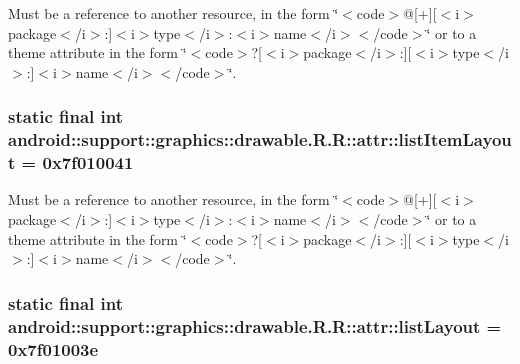 Must be a reference to another resource, in the form \char`\"{}$<$code$>$@\mbox{[}+\mbox{]}\mbox{[}$<$i$>$package$<$/i$>$:\mbox{]}$<$i$>$type$<$/i$>$:$<$i$>$name$<$/i$>$$<$/code$>$\char`\"{} or to a theme attribute in the form \char`\"{}$<$code$>$?\mbox{[}$<$i$>$package$<$/i$>$:\mbox{]}\mbox{[}$<$i$>$type$<$/i$>$:\mbox{]}$<$i$>$name$<$/i$>$$<$/code$>$\char`\"{}. \hypertarget{classandroid_1_1support_1_1graphics_1_1drawable_1_1_r_1_1attr_351fa26f9f498f2c645ec7794e1f63a6}{
\subsubsection[{listItemLayout}]{\setlength{\rightskip}{0pt plus 5cm}static final int android::support::graphics::drawable.R.R::attr::listItemLayout = 0x7f010041}}
\label{classandroid_1_1support_1_1graphics_1_1drawable_1_1_r_1_1attr_351fa26f9f498f2c645ec7794e1f63a6}


Must be a reference to another resource, in the form \char`\"{}$<$code$>$@\mbox{[}+\mbox{]}\mbox{[}$<$i$>$package$<$/i$>$:\mbox{]}$<$i$>$type$<$/i$>$:$<$i$>$name$<$/i$>$$<$/code$>$\char`\"{} or to a theme attribute in the form \char`\"{}$<$code$>$?\mbox{[}$<$i$>$package$<$/i$>$:\mbox{]}\mbox{[}$<$i$>$type$<$/i$>$:\mbox{]}$<$i$>$name$<$/i$>$$<$/code$>$\char`\"{}. \hypertarget{classandroid_1_1support_1_1graphics_1_1drawable_1_1_r_1_1attr_748eaba4836f9fd07dccf78906f08c5b}{
\subsubsection[{listLayout}]{\setlength{\rightskip}{0pt plus 5cm}static final int android::support::graphics::drawable.R.R::attr::listLayout = 0x7f01003e}}
\label{classandroid_1_1support_1_1graphics_1_1drawable_1_1_r_1_1attr_748eaba4836f9fd07dccf78906f08c5b}


